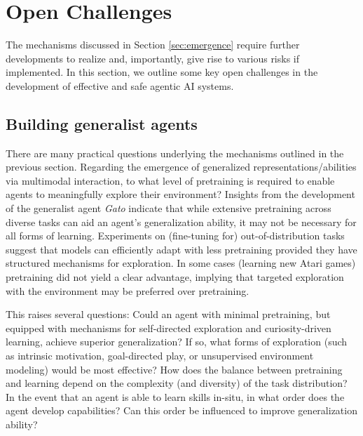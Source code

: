 \documentclass{article}
\theoremstyle{plain}
\theoremstyle{definition}
\theoremstyle{remark}
\begin{document}



\section{Open Challenges}
\label{sec:challenges}

The mechanisms discussed in Section \ref{sec:emergence} require further developments to realize and, importantly, give rise to various risks if implemented. In this section, we outline some key open challenges in the development of effective and safe agentic AI systems. 



\subsection{Building generalist agents}

There are many practical questions underlying the mechanisms outlined in the previous section. Regarding the emergence of generalized representations/abilities via multimodal interaction, to what level of pretraining is required to enable agents to meaningfully explore their environment? Insights from the development of the generalist agent \emph{Gato} \cite{reed2022generalist} indicate that while extensive pretraining across diverse tasks can aid an agent’s generalization ability, it may not be necessary for all forms of learning. Experiments on (fine-tuning for) out-of-distribution tasks suggest that models can efficiently adapt with less pretraining provided they have structured mechanisms for exploration. In some cases (learning new Atari games) pretraining did not yield a clear advantage, implying that targeted exploration with the environment may be preferred over pretraining.

This raises several questions: Could an agent with minimal pretraining, but equipped with mechanisms for self-directed exploration and curiosity-driven learning, achieve superior generalization? If so, what forms of exploration (such as intrinsic motivation, goal-directed play, or unsupervised environment modeling) would be most effective? How does the balance between pretraining and learning depend on the complexity (and diversity) of the task distribution? In the event that an agent is able to learn skills in-situ, in what order does the agent develop capabilities? Can this order be influenced to improve generalization ability?
\end{document}

